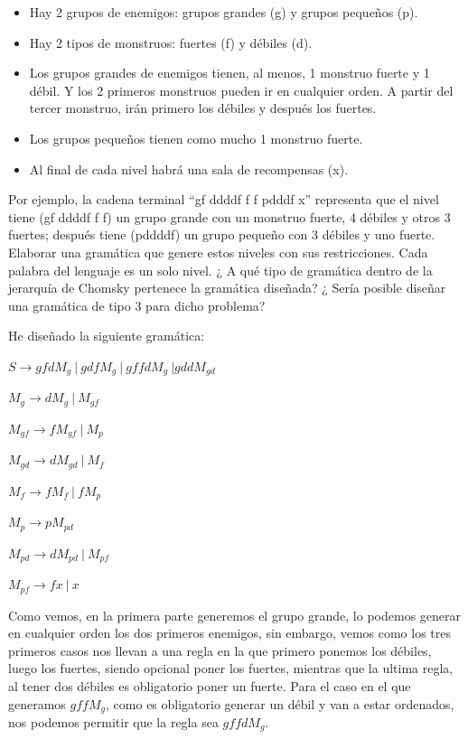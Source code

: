 \documentclass[12pt, spanish]{article}
\begin{document}
\begin{itemize}
	\item{Hay 2 grupos de enemigos: grupos grandes (g) y grupos pequeños (p).}
	\item{Hay 2 tipos de monstruos: fuertes (f) y débiles (d).}
	\item{Los grupos grandes de enemigos tienen, al menos, 1 monstruo fuerte y 1 débil. Y los 2 primeros monstruos pueden ir en cualquier orden. A partir del tercer monstruo, irán primero los débiles y después los fuertes.}
	\item{Los grupos pequeños tienen como mucho 1 monstruo fuerte.}
	\item{Al final de cada nivel habrá una sala de recompensas (x).}
\end{itemize}

Por ejemplo, la cadena terminal ``gf ddddf f f pdddf x''  representa que el nivel tiene (gf ddddf f f) un grupo grande con un monstruo fuerte, 4 débiles y otros 3 fuertes; después tiene (pddddf) un grupo pequeño con 3 débiles y uno fuerte. Elaborar una gramática que genere estos niveles con sus restricciones. Cada palabra del lenguaje es un solo nivel. ¿ A qué tipo de gramática dentro de la jerarquía de Chomsky pertenece la gramática diseñada? ¿ Sería posible diseñar una gramática de tipo 3 para dicho problema?

\vspace{1.5cm}

He diseñado la siguiente gramática:


\begin{center}

	$S \rightarrow gfdM_g\ \vert\ gdfM_g\ \vert\ gffdM_g\ \vert gddM_{gd}\ $
	
	$M_g \rightarrow dM_g\ \vert\ M_{gf}\ $
	
	$M_{gf} \rightarrow fM_{gf}\ \vert\ M_p\ $
	
	$M_{gd} \rightarrow dM_{gd}\ \vert\ M_f\ $
	
	$M_f \rightarrow fM_f\ \vert\ fM_p\ $
	
	$M_p \rightarrow pM_{pd} $
	
	$M_{pd} \rightarrow dM_{pd}\ \vert\ M_{pf}\ $
	
	$M_{pf} \rightarrow fx\ \vert\ x\ $
	

\end{center}

Como vemos, en la primera parte generemos el grupo grande, lo podemos generar en cualquier orden los dos primeros enemigos, sin embargo, vemos como los tres primeros casos nos llevan a una regla en la que primero ponemos los débiles, luego los fuertes, siendo opcional poner los fuertes, mientras que la ultima regla, al tener dos débiles es obligatorio poner un fuerte. Para el caso en el que generamos $gffM_g$, como es obligatorio generar un débil y van a estar ordenados, nos podemos permitir que la regla sea $gffdM_g$.
\end{document}
